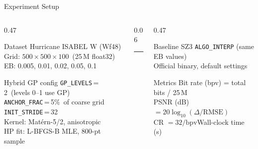 \documentclass[aspectratio=169, 10pt]{beamer}
\begin{document}
\begin{frame}{Experiment Setup}
\vspace{0.2em}
\begin{columns}[T, totalwidth=\textwidth]

  \begin{column}{0.47\textwidth}
    \begin{block}{Dataset}
      \footnotesize
      Hurricane ISABEL W (Wf48)\\
      Grid: $500 \times 500 \times 100$\ (25\,M float32)\\
      EB: 0.005, 0.01, 0.02, 0.05, 0.1
    \end{block}

    \medskip
    \begin{block}{Hybrid GP config}
      \footnotesize
      \texttt{GP\_LEVELS}\,=\,2\ (levels 0--1 use GP)\\
      \texttt{ANCHOR\_FRAC}\,=\,5\%\ of coarse grid\\
      \texttt{INIT\_STRIDE}\,=\,32\\
      Kernel: Matérn-5/2, anisotropic\\
      HP fit: L-BFGS-B MLE, 800-pt sample
    \end{block}
  \end{column}

  \begin{column}{0.06\textwidth}
    \color{cteal}\rule{1pt}{0.72\textheight}
  \end{column}

  \begin{column}{0.47\textwidth}
    \begin{block}{Baseline}
      \footnotesize
      SZ3 \texttt{ALGO\_INTERP} (same EB values)\\
      Official binary, default settings
    \end{block}

    \medskip
    \begin{block}{Metrics}
      \footnotesize
      Bit rate (bpv) = total bits / 25\,M\\
      PSNR (dB) $= 20\log_{10}(\Delta/\mathrm{RMSE})$\\
      CR $= 32 / \mathrm{bpv}$\quad Wall-clock time (s)
    \end{block}
  \end{column}

\end{columns}
\end{frame}
\end{document}
